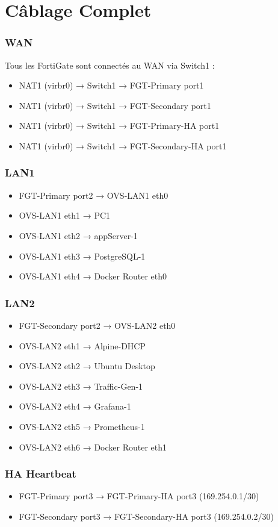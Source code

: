 \chapter{Câblage Complet}
\label{annexe:cablage}

\subsection{WAN}

Tous les FortiGate sont connectés au WAN via Switch1 :
\begin{itemize}
    \item NAT1 (virbr0) → Switch1 → FGT-Primary port1
    \item NAT1 (virbr0) → Switch1 → FGT-Secondary port1
    \item NAT1 (virbr0) → Switch1 → FGT-Primary-HA port1
    \item NAT1 (virbr0) → Switch1 → FGT-Secondary-HA port1
\end{itemize}

\subsection{LAN1}

\begin{itemize}
    \item FGT-Primary port2 → OVS-LAN1 eth0
    \item OVS-LAN1 eth1 → PC1
    \item OVS-LAN1 eth2 → appServer-1
    \item OVS-LAN1 eth3 → PostgreSQL-1
    \item OVS-LAN1 eth4 → Docker Router eth0
\end{itemize}

\subsection{LAN2}

\begin{itemize}
    \item FGT-Secondary port2 → OVS-LAN2 eth0
    \item OVS-LAN2 eth1 → Alpine-DHCP
    \item OVS-LAN2 eth2 → Ubuntu Desktop
    \item OVS-LAN2 eth3 → Traffic-Gen-1
    \item OVS-LAN2 eth4 → Grafana-1
    \item OVS-LAN2 eth5 → Prometheus-1
    \item OVS-LAN2 eth6 → Docker Router eth1
\end{itemize}

\subsection{HA Heartbeat}

\begin{itemize}
    \item FGT-Primary port3 → FGT-Primary-HA port3 (169.254.0.1/30)
    \item FGT-Secondary port3 → FGT-Secondary-HA port3 (169.254.0.2/30)
\end{itemize}

